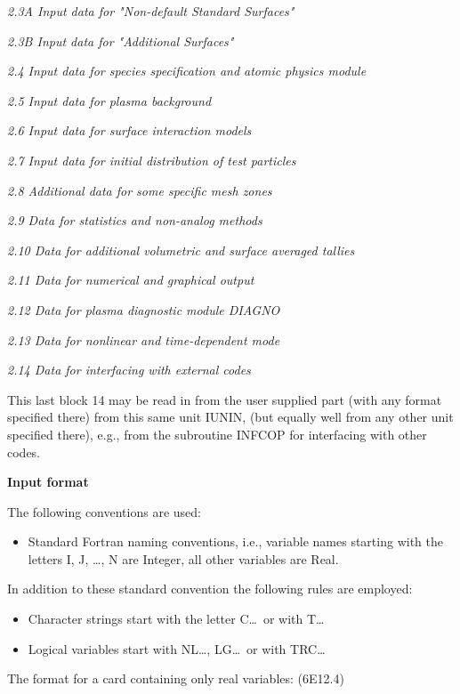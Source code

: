 \textsl{2.3A Input data for "Non-default Standard Surfaces"}

\textsl{2.3B Input data for "Additional Surfaces"}

\textsl{2.4  Input data for species specification and atomic physics module}

\textsl{2.5  Input data for plasma background}

\textsl{2.6  Input data for surface interaction models}

\textsl{2.7  Input data for initial distribution of test particles}

\textsl{2.8  Additional data for some specific mesh zones}

\textsl{2.9  Data for statistics and non-analog methods}

\textsl{2.10 Data for additional volumetric and surface averaged tallies}

\textsl{2.11 Data for numerical and graphical output}

\textsl{2.12 Data for plasma diagnostic module DIAGNO}

\textsl{2.13 Data for nonlinear and time-dependent mode}

\textsl{2.14 Data for interfacing with external codes}

\medskip

This last block 14 may be read in from the user supplied part (with any format
specified there) from this same unit IUNIN, (but equally well from any other
unit specified there), e.g., from the subroutine INFCOP for interfacing with
other codes.

\medskip 

\textbf{Input format} 

\medskip 

The following conventions are used:
\begin{itemize}
  \item Standard Fortran naming conventions, i.e., variable names starting with
        the letters I, J, \dots, N are Integer, all other variables are Real.
\end{itemize}
In addition to these standard convention the following rules are employed:
\begin{itemize}
  \item Character strings start with the letter C\dots\ or with T\dots
  \item
        Logical variables start with NL\dots, LG\dots\ or with TRC\dots
\end{itemize}
The format for a card containing only real variables: (6E12.4)

